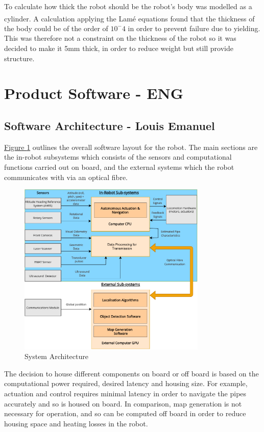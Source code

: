 \documentclass[11pt]{article}		%
\newcommand{\supercite}[1]{\textsuperscript{\cite{#1}}}		%
\newcommand{\figref}[1]{\hyperref[#1]{Figure \ref*{#1}}}    %
\begin{document}
		   To calculate how thick the robot should be the robot's body was modelled as a cylinder. A calculation applying the Lamé equations \supercite{lame} found that the thickness of the body could be of the order of $10^-4$ in order to prevent failure due to yielding. This was therefore not a constraint on the thickness of the robot so it was decided to make it 5mm thick, in order to reduce weight but still provide structure.
	
	\section{Product Software - ENG}
		\subsection[Software Architecture] {Software Architecture - Louis Emanuel}
        
	         \figref{overalls} outlines the overall software layout for the robot. The main sections are the in-robot subsystems which consists of the sensors and computational functions carried out on board, and the external systems which the robot communicates with via an optical fibre. 
	         \\
    		\begin{figure}[h]
				\centering
				\includegraphics[width = 0.8\textwidth]{subsystemss}
				\caption{System Architecture}
				\label{overalls}
			\end{figure}
	         \hspace*{3ex}The decision to house different components on board or off board is based on the computational power required, desired latency and housing size. For example, actuation and control requires minimal latency in order to navigate the pipes accurately and so is housed on board. In comparison, map generation is not necessary for operation, and so can be computed off board in order to reduce housing space and heating losses in the robot. \\
	
\end{document}

